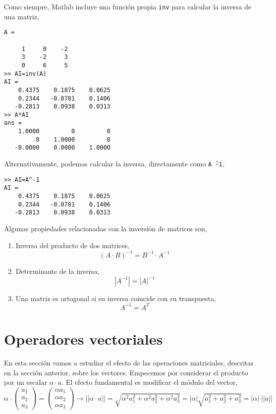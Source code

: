 Como siempre, Matlab incluye una función propia \texttt{inv} para calcular la inversa de una matriz,
\begin{verbatim}
A =

     1     0    -2
     3    -2     3
     0     6     5
>> AI=inv(A)
AI =
    0.4375    0.1875    0.0625
    0.2344   -0.0781    0.1406
   -0.2813    0.0938    0.0313
>> A*AI
ans =
    1.0000         0         0
         0    1.0000         0
   -0.0000    0.0000    1.0000
\end{verbatim}
 
Alternativamente, podemos calcular la inversa, directamente como \texttt{A\^\ -1},
\begin{verbatim}
>> AI=A^-1
AI =
    0.4375    0.1875    0.0625
    0.2344   -0.0781    0.1406
   -0.2813    0.0938    0.0313
\end{verbatim} 
Algunas propiedades relacionadas con la inversión de matrices son,
\begin{enumerate}
\item Inversa del producto de dos matrices,
\begin{equation*}
(A\cdot B)^{-1}=B^{-1}\cdot A^{-1}
\end{equation*}

\item Determinante de la inversa,
\begin{equation*}
\left\vert A^{-1} \right\vert = \vert A \vert ^{-1}
\end{equation*}

\item Una matriz es ortogonal si su inversa coincide con su transpuesta,
\begin{equation*}
A^{-1}=A^T
\end{equation*}
\end{enumerate}

\section{Operadores vectoriales}\label{opvect}
En esta sección vamos a estudiar el efecto de las operaciones matriciales, descritas en la sección anterior, sobre los vectores. Empecemos por considerar el producto por un escalar $\alpha \cdot a$. El efecto fundamental es modificar el módulo del vector,
\begin{equation*}
\alpha \cdot \begin{pmatrix}
a_1\\
a_2\\
a_3
\end{pmatrix}=
\begin{pmatrix}
\alpha a_1\\
\alpha a_2\\
\alpha a_3
\end{pmatrix}\rightarrow \vert \vert \alpha \cdot a \vert \vert =\sqrt{\alpha ^2a_1^2+\alpha ^2a_2^2+\alpha ^2a_3^2}=\vert \alpha \vert  \sqrt{a_1^2+a_2^2+a_3^2}=\vert \alpha \vert \cdot \vert \vert a \vert \vert
\end{equation*}

